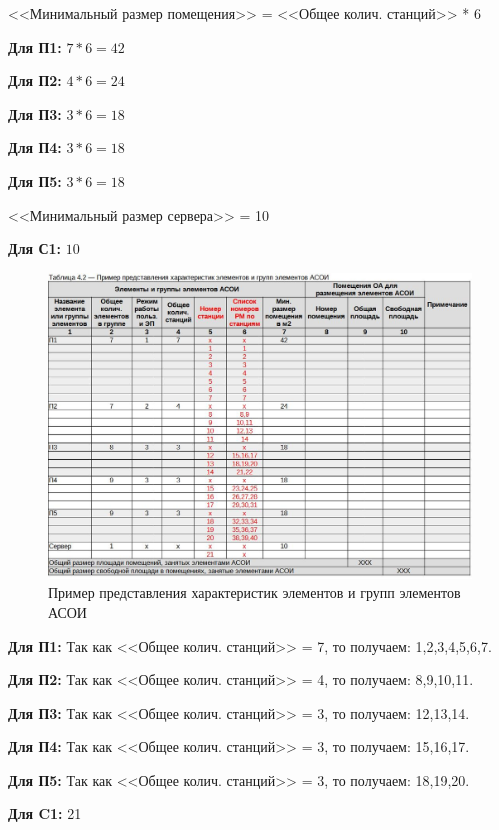 \documentclass[12pt, a4paper, simple]{eskdtext}
\begin{document}
    <<Минимальный размер помещения>> = <<Общее колич. станций>> * 6

    \textbf{Для П1:} $7 * 6 = 42$ 

    \textbf{Для П2:} $4 * 6 = 24$

    \textbf{Для П3:} $3 * 6 = 18$

    \textbf{Для П4:} $3 * 6 = 18$

    \textbf{Для П5:} $3 * 6 = 18$

    <<Минимальный размер сервера>> = 10

    \textbf{Для С1:} $10$

    \newpage
    \begin{figure}[ht!]
        \centering
        \includegraphics[width=14cm]
            {_docs/Таблица4-2ПримерПредставленияХарактеристикЭлементовИГруппЭлементовАСОИ.jpg}
        \caption{Пример представления характеристик элементов и групп элементов АСОИ}
    \end{figure}

    \textbf{Для П1:} Так как <<Общее колич. станций>> = 7, то получаем: 1,2,3,4,5,6,7.

    \textbf{Для П2:} Так как <<Общее колич. станций>> = 4, то получаем: 8,9,10,11.

    \textbf{Для П3:} Так как <<Общее колич. станций>> = 3, то получаем: 12,13,14.

    \textbf{Для П4:} Так как <<Общее колич. станций>> = 3, то получаем: 15,16,17.

    \textbf{Для П5:} Так как <<Общее колич. станций>> = 3, то получаем: 18,19,20.

    \textbf{Для C1:} 21
\end{document}
